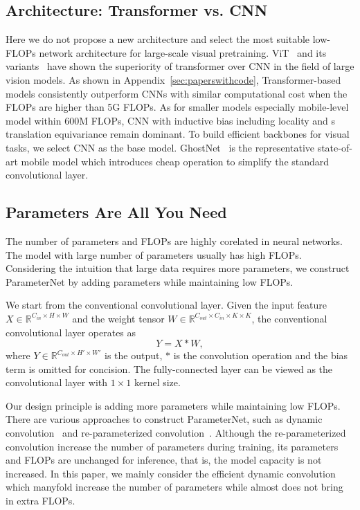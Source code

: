 \documentclass{article}
\begin{document}
\subsection{Architecture: Transformer vs. CNN}
Here we do not propose a new architecture and select the most suitable low-FLOPs network architecture for large-scale visual pretraining.
ViT~\cite{vit} and its variants~\cite{swin,tnt,pvt} have shown the superiority of transformer over CNN in the field of large vision models. As shown in Appendix~\ref{sec:paperswithcode}, Transformer-based models consistently outperform CNNs with similar computational cost when the FLOPs are higher than 5G FLOPs. As for smaller models especially mobile-level model within 600M FLOPs, CNN with inductive bias including locality and s translation equivariance remain dominant. To build efficient backbones for visual tasks, we select CNN as the base model. GhostNet~\cite{ghostnet} is the representative state-of-art mobile model which introduces cheap operation to simplify the standard convolutional layer. 


\subsection{Parameters Are All You Need}
The number of parameters and FLOPs are highly corelated in neural networks. The model with large number of parameters usually has high FLOPs. Considering the intuition that large data requires more parameters, we construct ParameterNet by adding parameters while maintaining low FLOPs.

We start from the conventional convolutional layer. Given the input feature $X\in\mathbb{R}^{C_{in}\times H\times W}$ and the weight tensor $W\in\mathbb{R}^{C_{out}\times C_{in}\times K\times K}$, the conventional convolutional layer operates as
\begin{equation}
	Y = X * W,
\end{equation}
where $Y\in\mathbb{R}^{C_{out}\times H'\times W'}$ is the output, $*$ is the convolution operation and the bias term is omitted for concision. The fully-connected layer can be viewed as the convolutional layer with $1\times1$ kernel size.

Our design principle is adding more parameters while maintaining low FLOPs. There are various approaches to construct ParameterNet, such as dynamic convolution~\cite{dynamic-conv} and re-parameterized convolution~\cite{repvgg}. Although the re-parameterized convolution increase the number of parameters during training, its parameters and FLOPs are unchanged for inference, that is, the model capacity is not increased. In this paper, we mainly consider the efficient dynamic convolution which manyfold increase the number of parameters while almost does not bring in extra FLOPs. 
\end{document}
